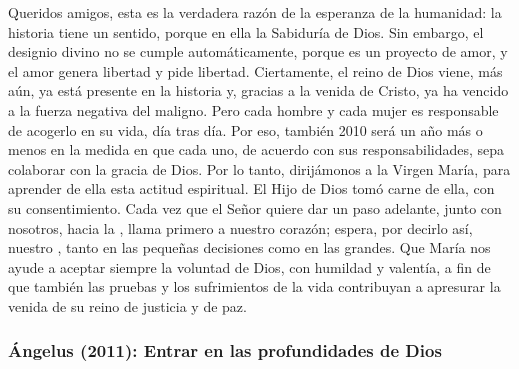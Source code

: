 \begin{body}
	Queridos amigos, esta es la verdadera razón de la esperanza de la humanidad: la historia tiene un sentido, porque en ella  la Sabiduría de Dios. Sin embargo, el designio divino no se cumple automáticamente, porque es un proyecto de amor, y el amor genera libertad y pide libertad. Ciertamente, el reino de Dios viene, más aún, ya está presente en la historia y, gracias a la venida de Cristo, ya ha vencido a la fuerza negativa del maligno. Pero cada hombre y cada mujer es responsable de acogerlo en su vida, día tras día. Por eso, también 2010 será un año más o menos  en la medida en que cada uno, de acuerdo con sus responsabilidades, sepa colaborar con la gracia de Dios. Por lo tanto, dirijámonos a la Virgen María, para aprender de ella esta actitud espiritual. El Hijo de Dios tomó carne de ella, con su consentimiento. Cada vez que el Señor quiere dar un paso adelante, junto con nosotros, hacia la , llama primero a nuestro corazón; espera, por decirlo así, nuestro , tanto en las pequeñas decisiones como en las grandes. Que María nos ayude a aceptar siempre la voluntad de Dios, con humildad y valentía, a fin de que también las pruebas y los sufrimientos de la vida contribuyan a apresurar la venida de su reino de justicia y de paz.
\end{body}

\subsubsection{Ángelus (2011): Entrar en las profundidades de Dios}


